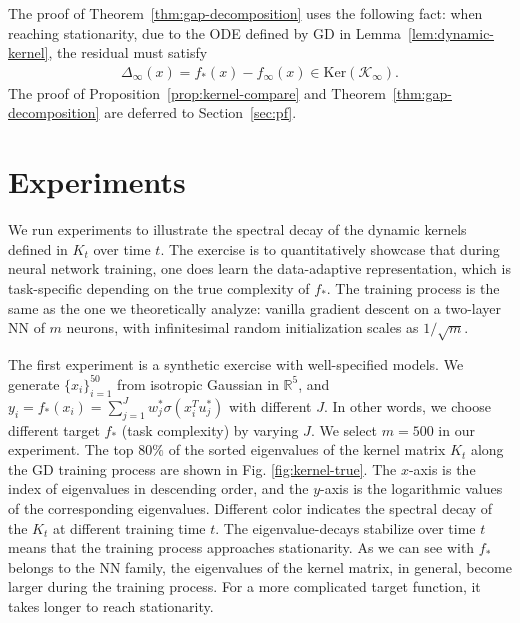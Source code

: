 \documentclass[11pt]{article}
\numberwithin{equation}{section}
\begin{document}
    The proof of Theorem~\ref{thm:gap-decomposition} uses the following fact: when reaching stationarity, due to the ODE defined by GD in Lemma~\ref{lem:dynamic-kernel}, the residual must satisfy
    \begin{align}\label{eq:null-gd}
        \Delta_\infty(x) = f_*(x) - f_{\infty}(x) \in \text{Ker}(\mathcal{K}_{\infty}).
    \end{align}
    The proof of Proposition~\ref{prop:kernel-compare} and Theorem~\ref{thm:gap-decomposition} are deferred to Section~\ref{sec:pf}.
    



    


\section{Experiments}


We run experiments to illustrate the spectral decay of the dynamic kernels defined in $K_t$ over time $t$. The exercise is to quantitatively showcase that during neural network training, one does learn the data-adaptive representation, which is task-specific depending on the true complexity of $f_*$. The training process is the same as the one we theoretically analyze: vanilla gradient descent on a two-layer NN of $m$ neurons, with infinitesimal random initialization scales as $1/\sqrt{m}$.

The first experiment is a synthetic exercise with well-specified models. We generate $\{x_i\}_{i=1}^{50}$ from isotropic Gaussian in $\mathbb{R}^5$, and $y_i = f_*(x_i) = \sum_{j=1}^J w^*_j\sigma(x_i^Tu^*_j)$  with different $J$. In other words, we choose different target $f_*$ (task complexity) by varying $J$. We select $m=500$ in our experiment. The top $80\%$ of the sorted eigenvalues of the kernel matrix $K_t$ along the GD training process are shown in Fig. \ref{fig:kernel-true}. The $x$-axis is the index of eigenvalues in descending order, and the $y$-axis is the logarithmic values of the corresponding eigenvalues. Different color indicates the spectral decay of the $K_t$ at different training time $t$. The eigenvalue-decays stabilize over time $t$ means that the training process approaches stationarity. As we can see with $f_*$ belongs to the NN family, the eigenvalues of the kernel matrix, in general, become larger during the training process. For a more complicated target function, it takes longer to reach stationarity.
\end{document}
